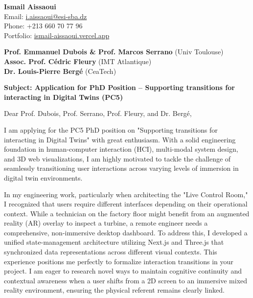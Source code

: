 \documentclass[11pt,a4paper]{article}
\begin{document}
\thispagestyle{empty}

\begin{flushright}
\textbf{Ismail Aissaoui} \\
Email: \href{mailto:i.aissaoui@esi-sba.dz}{i.aissaoui@esi-sba.dz} \\
Phone: +213 660 70 77 96 \\
Portfolio: \href{https://ismail-aissaoui.vercel.app}{ismail-aissaoui.vercel.app}
\end{flushright}

\vspace{1em}

\begin{flushleft}
\textbf{Prof. Emmanuel Dubois \& Prof. Marcos Serrano} (Univ Toulouse) \\
\textbf{Assoc. Prof. Cédric Fleury} (IMT Atlantique) \\
\textbf{Dr. Louis-Pierre Bergé} (CeaTech)
\end{flushleft}

\vspace{1em}
\noindent\textbf{Subject: Application for PhD Position -- Supporting transitions for interacting in Digital Twins (PC5)}
\vspace{1em}

\noindent Dear Prof. Dubois, Prof. Serrano, Prof. Fleury, and Dr. Bergé,

\vspace{1em}
\noindent
I am applying for the PC5 PhD position on "Supporting transitions for interacting in Digital Twins" with great enthusiasm. With a solid engineering foundation in human-computer interaction (HCI), multi-modal system design, and 3D web visualizations, I am highly motivated to tackle the challenge of seamlessly transitioning user interactions across varying levels of immersion in digital twin environments.

\vspace{0.5em}
\noindent
In my engineering work, particularly when architecting the "Live Control Room," I recognized that users require different interfaces depending on their operational context. While a technician on the factory floor might benefit from an augmented reality (AR) overlay to inspect a turbine, a remote engineer needs a comprehensive, non-immersive desktop dashboard. To address this, I developed a unified state-management architecture utilizing Next.js and Three.js that synchronized data representations across different visual contexts. This experience positions me perfectly to formalize interaction transitions in your project. I am eager to research novel ways to maintain cognitive continuity and contextual awareness when a user shifts from a 2D screen to an immersive mixed reality environment, ensuring the physical referent remains clearly linked.
\end{document}
